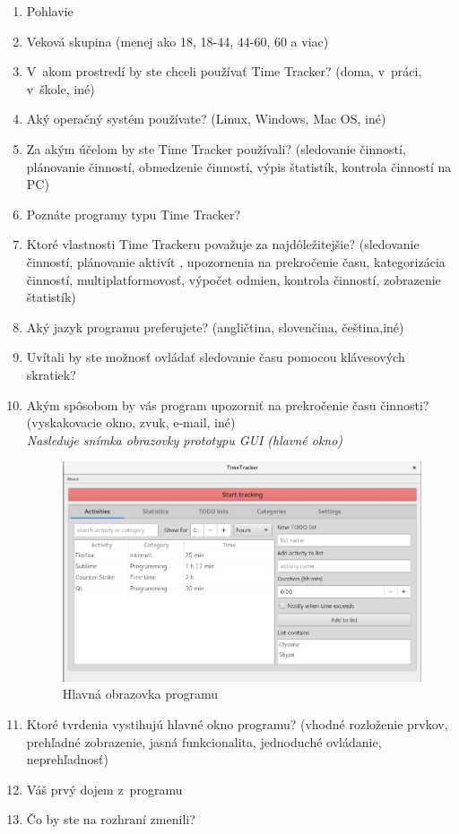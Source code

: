 \documentclass[]{article}
\begin{document}
\begin{enumerate}
	\item Pohlavie
	\item Veková skupina (menej ako 18, 18-44, 44-60, 60 a viac)
	\item V~akom prostredí by ste chceli používať Time Tracker? (doma, v~práci, v~škole, iné)
	\item Aký operačný systém používate? (Linux, Windows, Mac OS, iné)
	\item Za akým účelom by ste Time Tracker používali? (sledovanie činností, plánovanie činností, obmedzenie činností, výpis štatistík, kontrola činností na PC)
	\item Poznáte programy typu Time Tracker?  
	\item Ktoré vlastnosti Time Trackeru považuje za najdôležitejšie? (sledovanie činností, plánovanie aktivít , upozornenia na prekročenie času, kategorizácia činností, multiplatformovosť, výpočet odmien, kontrola činností, zobrazenie štatistík)
	\item Aký jazyk programu preferujete? (angličtina, slovenčina, čeština,iné)
	\item Uvítali by ste možnosť ovládať sledovanie času pomocou klávesových skratiek?
	\item Akým spôsobom by vás program upozorniť na prekročenie času činnosti? (vyskakovacie okno, zvuk, e-mail, iné)\\
	
	\textit{Nasleduje snímka obrazovky prototypu GUI (hlavné okno)}
	\begin{figure}[h!]
		\includegraphics[width=\textwidth]{hlavna_obrazovka}
		\caption{Hlavná obrazovka programu}
	\end{figure}
	\item Ktoré tvrdenia vystihujú hlavné okno programu? (vhodné rozloženie prvkov, prehľadné zobrazenie, jasná funkcionalita, jednoduché ovládanie, neprehľadnosť)
	\item Váš prvý dojem z~programu
	\item Čo by ste na rozhraní zmenili? 
\end{enumerate}
\end{document}
